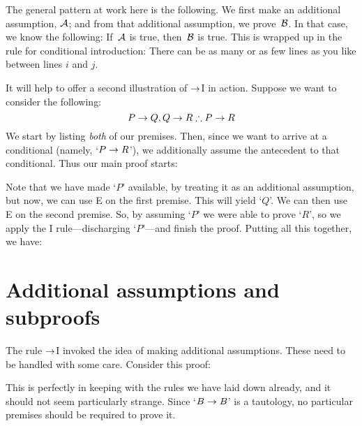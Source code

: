 The general pattern at work here is the following. We first make an additional assumption, $\mathcal{A}$; and from that additional assumption, we prove~$\mathcal{B}$. In that case, we know the following: If~$\mathcal{A}$ is true, then~$\mathcal{B}$ is true. This is wrapped up in the rule for conditional introduction:
There can be as many or as few lines as you like between lines $i$ and $j$.

It will help to offer a second  illustration of $\rightarrow$I in action. Suppose we want to consider the following:
	$$P \eif Q, Q \eif R \therefore P \eif R$$
We start by listing \emph{both} of our premises. Then, since we want to arrive at a conditional (namely, `$P \rightarrow R$'), we additionally assume the antecedent to that conditional. Thus our main proof starts:
\begin{fitchproof}
	\open
	\close
\end{fitchproof}
Note that we have made `$P$' available, by treating it as an additional assumption, but now, we can use {\eif}E on the first premise. This will yield `$Q$'. We can then use {\eif}E on the second premise. So, by assuming `$P$' we were able to prove `$R$', so we apply the {\eif}I rule---discharging `$P$'---and finish the proof. Putting all this together, we have:
\label{HSproof}
\begin{fitchproof}
	\open
	\close
\end{fitchproof}


\section{Additional assumptions and subproofs}
The rule $\rightarrow$I invoked the idea of making additional assumptions. These need to be handled with some care. Consider this proof:
\begin{fitchproof}
	\open
		 
	\close
\end{fitchproof}
This is perfectly in keeping with the rules we have laid down already, and it should not seem particularly strange. Since `$B \rightarrow B$' is a tautology, no particular premises should be required to prove it.

